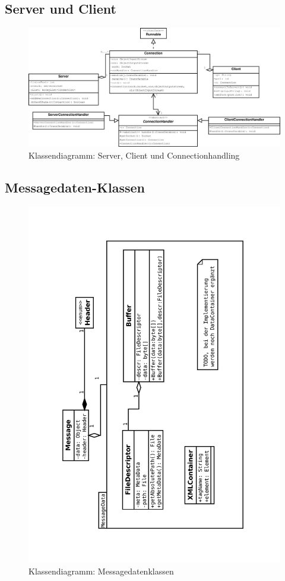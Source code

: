 \subsection{Server und Client}
\liable{\eddy}
\begin{figure}[H]
	\centering
	\label{dia:design:frontend:classes:svcl}
	\includegraphics[width=\textwidth]{design/frontend/classes/Server-Client-Klassen.pdf}
	\caption{Klassendiagramm: Server, Client und Connectionhandling}
\end{figure}

\subsection{Messagedaten-Klassen}
\liable{\eddy}

\begin{figure}[H]
	\centering
	\label{dia:design:frontend:classes:datcl}
	\includegraphics[angle=270, width=.8\textwidth]{design/frontend/classes/MessageDaten-Klassen.pdf}
	\caption{Klassendiagramm: Messagedatenklassen}
\end{figure}

